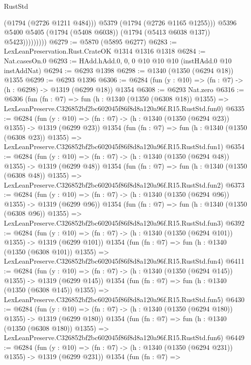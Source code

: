 \begin{lexlean}{RustStd}
\begin{coremodule}
                          (@1794 (@2726 @1211 @484)))
                        @5379
                        (@1794 (@2726 @1165 @1255)))
                      @5396
                      @5400
                      @5405
                      (@1794 (@5408 @6038))
                      (@1794 (@5413 @6038 @137))
                      @5423)))))))))
@6279 := @5870 (@5895 @6277)
@6283 := LexLeanPreservation.Rust.CrateOK @1314 @1316 @1318
@6284 := Nat.casesOn.{0}
@6293 := HAdd.hAdd.{0, 0, 0} @10 @10 @10 (instHAdd.{0} @10 instAddNat)
@6294 := @6293 @1398
@6298 := @1340 (@1350 (@6294 @18)) @1355
@6299 := @6293 @1396
@6306 := @6284 (fun (y : @10) => (fn : @7) -> (h : @6298) -> @1319 (@6299 @18)) @1354
@6308 := @6293 Nat.zero
@6316 := @6306
    (fun (fn : @7) =>
    fun (h : @1340 (@1350 (@6308 @18)) @1355) =>
    LexLeanPreserve.C326852bf2bc602045f86f8d8a120a96f.R15.RustStd.fun0)
@6335 := @6284
    (fun (y : @10) => (fn : @7) -> (h : @1340 (@1350 (@6294 @23)) @1355) -> @1319 (@6299 @23))
    @1354
    (fun (fn : @7) =>
    fun (h : @1340 (@1350 (@6308 @23)) @1355) =>
    LexLeanPreserve.C326852bf2bc602045f86f8d8a120a96f.R15.RustStd.fun1)
@6354 := @6284
    (fun (y : @10) => (fn : @7) -> (h : @1340 (@1350 (@6294 @48)) @1355) -> @1319 (@6299 @48))
    @1354
    (fun (fn : @7) =>
    fun (h : @1340 (@1350 (@6308 @48)) @1355) =>
    LexLeanPreserve.C326852bf2bc602045f86f8d8a120a96f.R15.RustStd.fun2)
@6373 := @6284
    (fun (y : @10) => (fn : @7) -> (h : @1340 (@1350 (@6294 @96)) @1355) -> @1319 (@6299 @96))
    @1354
    (fun (fn : @7) =>
    fun (h : @1340 (@1350 (@6308 @96)) @1355) =>
    LexLeanPreserve.C326852bf2bc602045f86f8d8a120a96f.R15.RustStd.fun3)
@6392 := @6284
    (fun (y : @10) => (fn : @7) -> (h : @1340 (@1350 (@6294 @101)) @1355) -> @1319 (@6299 @101))
    @1354
    (fun (fn : @7) =>
    fun (h : @1340 (@1350 (@6308 @101)) @1355) =>
    LexLeanPreserve.C326852bf2bc602045f86f8d8a120a96f.R15.RustStd.fun4)
@6411 := @6284
    (fun (y : @10) => (fn : @7) -> (h : @1340 (@1350 (@6294 @145)) @1355) -> @1319 (@6299 @145))
    @1354
    (fun (fn : @7) =>
    fun (h : @1340 (@1350 (@6308 @145)) @1355) =>
    LexLeanPreserve.C326852bf2bc602045f86f8d8a120a96f.R15.RustStd.fun5)
@6430 := @6284
    (fun (y : @10) => (fn : @7) -> (h : @1340 (@1350 (@6294 @180)) @1355) -> @1319 (@6299 @180))
    @1354
    (fun (fn : @7) =>
    fun (h : @1340 (@1350 (@6308 @180)) @1355) =>
    LexLeanPreserve.C326852bf2bc602045f86f8d8a120a96f.R15.RustStd.fun6)
@6449 := @6284
    (fun (y : @10) => (fn : @7) -> (h : @1340 (@1350 (@6294 @231)) @1355) -> @1319 (@6299 @231))
    @1354
    (fun (fn : @7) =>

\end{coremodule}
\end{lexlean}
